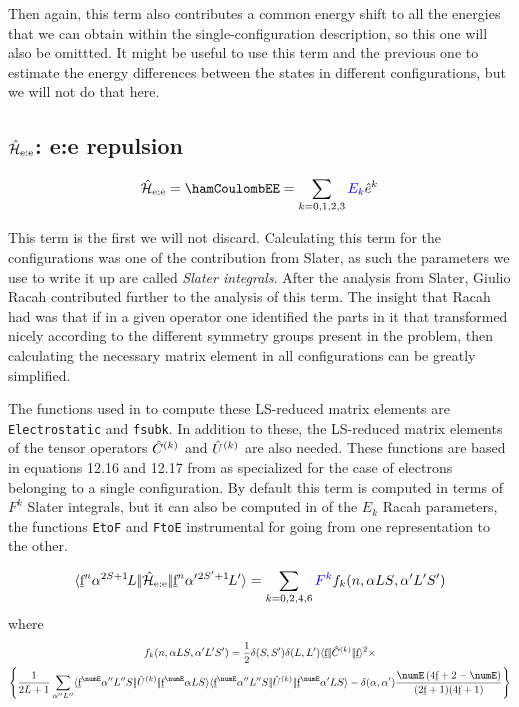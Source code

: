 \documentclass{article}
\begin{document}
Then again, this term also contributes a common energy shift to all the energies that we can obtain within the single-configuration description, so this one will also be omittted. It might be useful to use this term and the previous one to estimate the energy differences between the states in different configurations, but we will not do that here.

\subsection{$\hat{\mathcal{H}}_\text{e:e}$: e:e repulsion}
 
\begin{equation}
    \hamCoulombEESymbol = \hamCoulombEE = \sum_{k=0,1,2,3} \Ek \hat{e}^k 
\end{equation}  

This term is the first we will not discard. Calculating this term for the \fn configurations was one of the contribution from Slater, as such the parameters we use to write it up are called \textit{Slater integrals}. After the analysis from Slater, Giulio Racah contributed further to the analysis of this term. The insight that Racah had was that if in a given operator one identified the parts in it that transformed nicely according to the different symmetry groups present in the problem, then calculating the necessary matrix element in all \fn configurations can   be greatly simplified.

The functions used in \ql to compute these LS-reduced matrix elements are \texttt{Electrostatic} and \texttt{fsubk}. In addition to these, the LS-reduced matrix elements of the tensor operators $\hat{C}^{(k)}$ and $\hat{U}^{(k)}$ are also needed. These functions are based in equations 12.16 and 12.17 from \cowan  as specialized for the case of electrons belonging to a single \fn configuration. By default this term is computed in terms of $F^k$ Slater integrals, but it can also be computed in of the $E_k$ Racah parameters, the functions \texttt{EtoF} and \texttt{FtoE} instrumental for going from one representation to the other.
 
\begin{equation}
\langle \underbar{$\text{f}$}^n\alpha{}^{2S+1}{\kern-0.1em}{L}|\!|\hat{\mathcal{H}}_\text{e:e}|\!|\underbar{$\text{f}$}^n\alpha'{}^{2S'+1}{\kern-0.1em}{L'}\rangle = \sum_{k=0,2,4,6} \textcolor{blue}{{F^k}} f_k(n,\alpha{LS},\alpha'{L'S'})
\end{equation} 
where
\begin{multline}
    f_k(n,\alpha{LS},\alpha'{L'S'}) = \frac{1}{2} 
        \kronecker{S}{S'}
        \kronecker{L}{L'}
        \redbraopket{\forb}
            {\op{C}^{(k)}}
            {\forb}^2 \times \\
        \left\{ 
            \frac{1}{\tpo{L}} \sum_{\alpha''L''} 
                \redbraopket{\forb^\numE \alpha'' L'' S}
                    {\op{U}^{(k)}}
                    {\forb^\numE \alpha L S} 
            \redbraopket{\forb^\numE \alpha'' L'' S}
                {\op{U}^{(k)}} 
                {\forb^\numE \alpha' L S}
            - \kronecker{\alpha}{\alpha'}
                \frac{\numE \left(4 \forb + 2 - \numE\right)}
                    {(\tpo{\forb})(4 \forb + 1)} 
        \right\}
\end{multline}      
\end{document}
